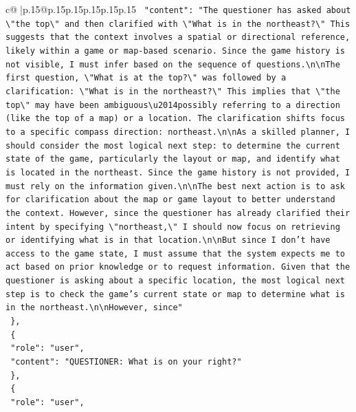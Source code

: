 \documentclass{article}
\begin{document}
{\begin{supertabular}{c@{$\;$}|p{.15\linewidth}@{}p{.15\linewidth}p{.15\linewidth}p{.15\linewidth}p{.15\linewidth}p{.15\linewidth}}
{{{\texttt{    "content": "The questioner has asked about \textbackslash{}"the top\textbackslash{}" and then clarified with \textbackslash{}"What is in the northeast?\textbackslash{}" This suggests that the context involves a spatial or directional reference, likely within a game or map{-}based scenario. Since the game history is not visible, I must infer based on the sequence of questions.\textbackslash{}n\textbackslash{}nThe first question, \textbackslash{}"What is at the top?\textbackslash{}" was followed by a clarification: \textbackslash{}"What is in the northeast?\textbackslash{}" This implies that \textbackslash{}"the top\textbackslash{}" may have been ambiguous\textbackslash{}u2014possibly referring to a direction (like the top of a map) or a location. The clarification shifts focus to a specific compass direction: northeast.\textbackslash{}n\textbackslash{}nAs a skilled planner, I should consider the most logical next step: to determine the current state of the game, particularly the layout or map, and identify what is located in the northeast. Since the game history is not provided, I must rely on the information given.\textbackslash{}n\textbackslash{}nThe best next action is to ask for clarification about the map or game layout to better understand the context. However, since the questioner has already clarified their intent by specifying \textbackslash{}"northeast,\textbackslash{}" I should now focus on retrieving or identifying what is in that location.\textbackslash{}n\textbackslash{}nBut since I don't have access to the game state, I must assume that the system expects me to act based on prior knowledge or to request information. Given that the questioner is asking about a specific location, the most logical next step is to check the game's current state or map to determine what is in the northeast.\textbackslash{}n\textbackslash{}nHowever, since"} \\
\texttt{  \},} \\
\texttt{  \{} \\
\texttt{    "role": "user",} \\
\texttt{    "content": "QUESTIONER: What is on your right?"} \\
\texttt{  \},} \\
\texttt{  \{} \\
\texttt{    "role": "user",} \\
}}}
\end{supertabular}}
\end{document}

